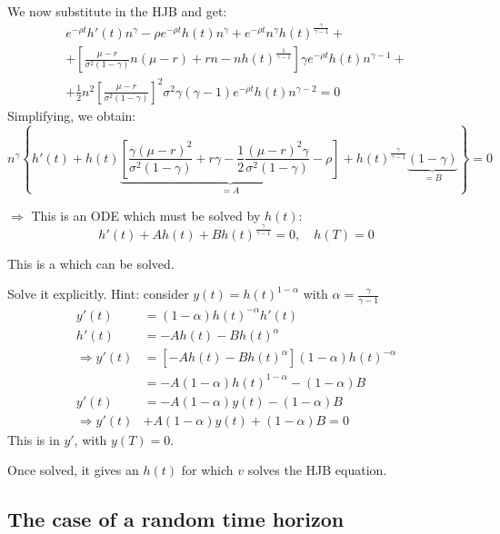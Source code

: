 We now substitute in the HJB and get:
\begin{multline*}
    e^{-\rho t} h'(t) n^\gamma - \rho e^{-\rho t} h(t) n^\gamma + e^{-\rho t} n^\gamma h(t)^{\frac{\gamma}{\gamma-1}} + \\
    + \left[ \frac{\mu-r}{\sigma^2(1-\gamma)} n(\mu-r) + rn - n h(t)^{\frac{1}{\gamma-1}} \right] \gamma e^{-\rho t} h(t) n^{\gamma-1} + \\
    + \frac{1}{2} n^2 \left[ \frac{\mu-r}{\sigma^2(1-\gamma)} \right]^2 \sigma^2 \gamma(\gamma-1) e^{-\rho t} h(t) n^{\gamma-2} = 0
\end{multline*}
Simplifying, we obtain:
\begin{equation*}
    n^\gamma \left\{ h'(t) + h(t) \underbrace{\left[ \frac{\gamma(\mu-r)^2}{\sigma^2(1-\gamma)} + r\gamma - \frac{1}{2} \frac{(\mu-r)^2 \gamma}{\sigma^2(1-\gamma)} - \rho \right]}_{= A} + h(t)^{\frac{\gamma}{\gamma-1}} \underbrace{(1-\gamma)}_{= B} \right\} = 0
\end{equation*}

$\Rightarrow$ This is an ODE which must be solved by $h(t)$:
\begin{equation*}
    h'(t) + A h(t) + B h(t)^{\frac{\gamma}{\gamma-1}} = 0, \quad h(T) = 0
\end{equation*}

This is a  which can be solved.

\begin{homework*}
    Solve it explicitly. Hint: consider $y(t) = h(t)^{1-\alpha}$ with $\alpha = \frac{\gamma}{\gamma-1}$
    \begin{align*}
        y'(t) &= (1-\alpha) h(t)^{-\alpha} h'(t) \\
        h'(t) &= -A h(t) - B h(t)^\alpha \\
        \Rightarrow y'(t) &= [-A h(t) - B h(t)^\alpha] (1-\alpha) h(t)^{-\alpha} \\
        &= -A (1-\alpha) h(t)^{1-\alpha} - (1-\alpha) B \\
        y'(t) &= -A (1-\alpha) y(t) - (1-\alpha) B \\
        \Rightarrow y'(t) &+ A (1-\alpha) y(t) + (1-\alpha) B = 0
    \end{align*}
    This is  in $y'$, with $y(T) = 0$.
\end{homework*}

Once solved, it gives an $h(t)$ for which $v$ solves the HJB equation.

\subsection*{\color{red}The case of a random time horizon}

